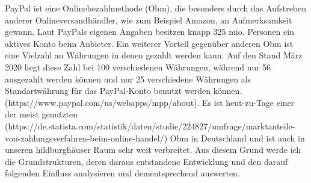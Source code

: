 PayPal ist eine Onlinebezahlmethode (Obm), die besonders durch das Aufstreben anderer Onlineversandhändler, wie zum Beispiel Amazon, an Aufmerksamkeit gewann. Laut PayPals eigenen Angaben besitzen knapp 325 mio. Personen ein aktives Konto beim Anbieter. Ein weiterer Vorteil gegenüber anderen Obm ist eine Vielzahl an Währungen in denen gezahlt werden kann. Auf den Stand März 2020 liegt diese Zahl bei 100 verschiedenen Währungen, während nur 56 ausgezahlt werden können und nur 25 verschiedene Währungen als Standartwährung für das PayPal-Konto benutzt werden können. (https://www.paypal.com/us/webapps/mpp/about).   
Es ist heut-zu-Tage einer der meist genutzten (https://de.statista.com/statistik/daten/studie/224827/umfrage/marktanteile-von-zahlungsverfahren-beim-online-handel/)  Obm in Deutschland und ist auch in unseren hildburghäuser Raum sehr weit verbreitet. Aus diesem Grund werde ich die Grundstrukturen, deren daraus entstandene Entwicklung und den darauf folgenden Einfluss analysieren und dementsprechend auswerten.


\cite[S. 30]{toni}